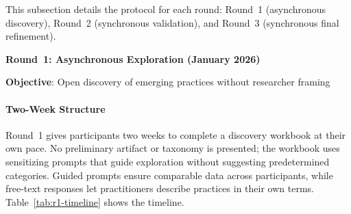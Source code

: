 This subsection details the protocol for each round: Round~1 (asynchronous
discovery), Round~2 (synchronous validation), and Round~3 (synchronous final
refinement).

\textbf{Round~1: Asynchronous Exploration (January 2026)}

\textbf{Objective}: Open discovery of emerging practices without researcher framing

\paragraph{Two-Week Structure}

Round~1 gives participants two weeks to complete a discovery workbook at their
own pace. No preliminary artifact or taxonomy is presented; the workbook uses
sensitizing prompts that guide exploration without suggesting predetermined
categories. Guided prompts ensure comparable data across participants, while
free-text responses let practitioners describe practices in their own terms.
Table~\ref{tab:r1-timeline} shows the timeline.

